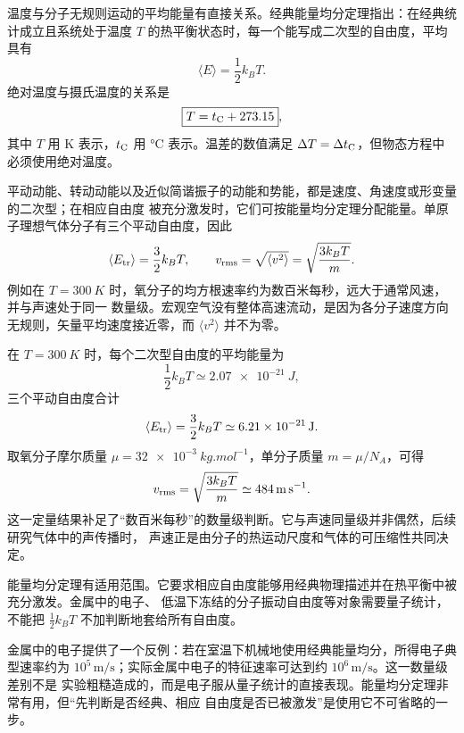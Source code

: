 {温度与分子无规则运动的平均能量有直接关系。经典能量均分定理指出：在经典统计成立且系统处于温度
$T$ 的热平衡状态时，每一个能写成二次型的自由度，平均具有
\begin{equation}
  \boxed{\langle E\rangle=\frac12k_BT}.
\end{equation}
绝对温度与摄氏温度的关系是
\begin{equation}
  \boxed{T=t_{\rm C}+273.15},
\end{equation}
其中 $T$ 用 K 表示，$t_{\rm C}$ 用 $\si{\degreeCelsius}$ 表示。温差的数值满足
$\Delta T=\Delta t_{\rm C}$，但物态方程中必须使用绝对温度。

平动动能、转动动能以及近似简谐振子的动能和势能，都是速度、角速度或形变量的二次型；在相应自由度
被充分激发时，它们可按能量均分定理分配能量。单原子理想气体分子有三个平动自由度，因此
\begin{equation}
  \left\langle E_{\rm tr}\right\rangle=\frac32k_BT,
  \qquad
  v_{\rm rms}=\sqrt{\langle v^2\rangle}=\sqrt{\frac{3k_BT}{m}}.
\end{equation}
例如在 $T=\SI{300}{K}$ 时，氧分子的均方根速率约为数百米每秒，远大于通常风速，并与声速处于同一
数量级。宏观空气没有整体高速流动，是因为各分子速度方向无规则，矢量平均速度接近零，而
$\langle v^2\rangle$ 并不为零。

在 $T=\SI{300}{K}$ 时，每个二次型自由度的平均能量为
\begin{equation}
  \frac12k_BT\simeq\SI{2.07e-21}{J},
\end{equation}
三个平动自由度合计
\begin{equation}
  \left\langle E_{\rm tr}\right\rangle
  =\frac32k_BT\simeq\SI{6.21e-21}{J}.
\end{equation}
取氧分子摩尔质量 $\mu=\SI{32e-3}{kg.mol^{-1}}$，单分子质量 $m=\mu/N_A$，可得
\begin{equation}
  v_{\rm rms}=\sqrt{\frac{3k_BT}{m}}\simeq\SI{484}{m.s^{-1}}.
\end{equation}
这一定量结果补足了“数百米每秒”的数量级判断。它与声速同量级并非偶然，后续研究气体中的声传播时，
声速正是由分子的热运动尺度和气体的可压缩性共同决定。

能量均分定理有适用范围。它要求相应自由度能够用经典物理描述并在热平衡中被充分激发。金属中的电子、
低温下冻结的分子振动自由度等对象需要量子统计，不能把 $\tfrac12k_BT$ 不加判断地套给所有自由度。

金属中的电子提供了一个反例：若在室温下机械地使用经典能量均分，所得电子典型速率约为
$10^5\,\mathrm{m/s}$；实际金属中电子的特征速率可达到约 $10^6\,\mathrm{m/s}$。这一数量级差别不是
实验粗糙造成的，而是电子服从量子统计的直接表现。能量均分定理非常有用，但“先判断是否经典、相应
自由度是否已被激发”是使用它不可省略的一步。

}
